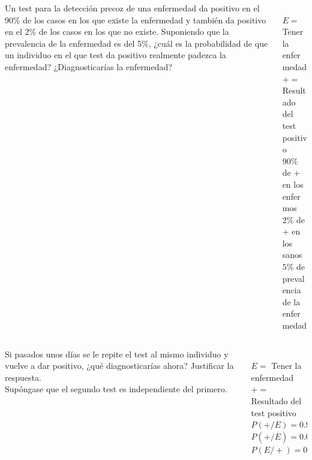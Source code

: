 \documentclass[aspectratio=149,10pt,xcolor=dvipsnames,t]{beamer}
\begin{document}
\begin{frame}
\begin{columns}
\begin{column}[T]{0.65\textwidth}
Un test para la detección precoz de una enfermedad da positivo en el 90\% de los casos en los que existe
la enfermedad y también da positivo en el 2\% de los casos en los que no existe. 
Suponiendo que la prevalencia de la enfermedad es del 5\%, ¿cuál es la probabilidad de que un individuo en el que test
da positivo realmente padezca la enfermedad? ¿Diagnosticarías la enfermedad?
\end{column}
\begin{column}[T]{0.35\textwidth}
\\
$E=$ Tener la enfermedad\\
$+=$ Resultado del test positivo\\
$90\%$ de + en los enfermos\\[5mm]
$2\%$ de + en los sanos \\[5mm]
$5\%$ de prevalencia de la enfermedad
\end{column}
\end{columns}
\end{frame}


\begin{frame}
\begin{columns}
\begin{column}[T]{0.65\textwidth}
Si pasados unos días se le repite el test al mismo individuo y vuelve a dar positivo, ¿qué diagnosticarías ahora?
Justificar la respuesta.\\ 
Supóngase que el segundo test es independiente del primero. 
\end{column}
\begin{column}[T]{0.35\textwidth}
\\
$E=$ Tener la enfermedad\\
$+=$ Resultado del test positivo\\
$P(+/E)=0.9$\\
$P(+/\overline E)=0.02$\\
$P(E/+)=0.7031$
\end{column}
\end{columns}
\end{frame}
\end{document}
